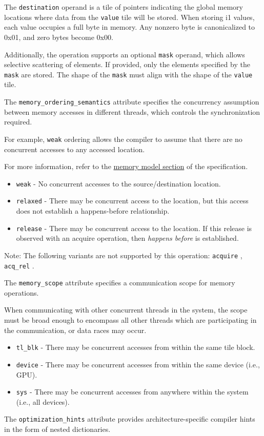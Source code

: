 \documentclass{article}
\begin{document}
The \texttt{destination} operand is a tile of pointers indicating the global memory locations where data from the \texttt{value} tile will be stored. When storing i1 values, each value occupies a full byte in memory. Any nonzero byte is canonicalized to 0x01, and zero bytes become 0x00.


Additionally, the operation supports an optional \texttt{mask} operand, which allows selective scattering of elements. If provided, only the elements specified by the \texttt{mask} are stored. The shape of the \texttt{mask} must align with the shape of the \texttt{value} tile.


The \texttt{memory\_ordering\_semantics} attribute specifies the concurrency assumption between memory accesses in different threads, which controls the synchronization required.

For example, \texttt{weak} ordering allows the compiler to assume that there are no concurrent accesses to any accessed location.

For more information, refer to the \href{https://docs.nvidia.com/cuda/tile-ir/latest/sections/memory_model.html#section-memory-model}{memory model section} of the specification.


\begin{itemize}
\item \texttt{weak} - No concurrent accesses to the source/destination location.
\item \texttt{relaxed} - There may be concurrent access to the location, but this access does not establish a happens-before relationship.
\item \texttt{release} - There may be concurrent access to the location. If this release is observed with an acquire operation, then \textit{happens before} is established.

\end{itemize}
Note: The following variants are not supported by this operation: \texttt{acquire} , \texttt{acq\_rel} .


The \texttt{memory\_scope} attribute specifies a communication scope for memory operations.

When communicating with other concurrent threads in the system, the scope must be broad enough to encompass all other threads which are participating in the communication, or data races may occur.


\begin{itemize}
\item \texttt{tl\_blk} - There may be concurrent accesses from within the same tile block.
\item \texttt{device} - There may be concurrent accesses from within the same device (i.e., GPU).
\item \texttt{sys} - There may be concurrent accesses from anywhere within the system (i.e., all devices).

\end{itemize}
The \texttt{optimization\_hints} attribute provides architecture-specific compiler hints in the form of nested dictionaries.
\end{document}
